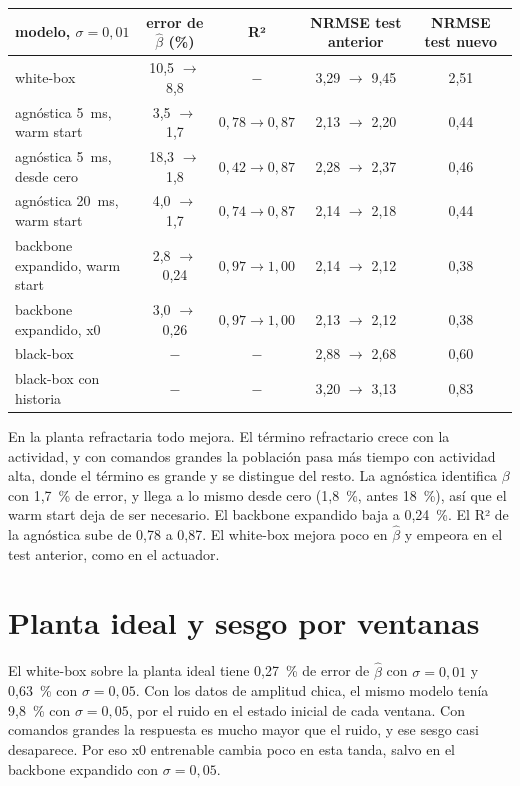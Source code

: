 \documentclass[10pt,a4paper]{article}
\newcommand{\bh}{\hat\beta}
\begin{document}
\begin{center}
\small
\begin{tabular}{@{}lcccc@{}}
\toprule
modelo, $\sigma = 0{,}01$ & error de $\bh$ (\%) & R² & NRMSE test anterior & NRMSE test nuevo \\
\midrule
white-box & 10,5 $\to$ 8,8 & $-$ & 3,29 $\to$ 9,45 & 2,51 \\
agnóstica 5~ms, warm start & 3,5 $\to$ 1,7 & $0{,}78 \to 0{,}87$ & 2,13 $\to$ 2,20 & 0,44 \\
agnóstica 5~ms, desde cero & 18,3 $\to$ 1,8 & $0{,}42 \to 0{,}87$ & 2,28 $\to$ 2,37 & 0,46 \\
agnóstica 20~ms, warm start & 4,0 $\to$ 1,7 & $0{,}74 \to 0{,}87$ & 2,14 $\to$ 2,18 & 0,44 \\
backbone expandido, warm start & 2,8 $\to$ 0,24 & $0{,}97 \to 1{,}00$ & 2,14 $\to$ 2,12 & 0,38 \\
backbone expandido, x0 & 3,0 $\to$ 0,26 & $0{,}97 \to 1{,}00$ & 2,13 $\to$ 2,12 & 0,38 \\
black-box & $-$ & $-$ & 2,88 $\to$ 2,68 & 0,60 \\
black-box con historia & $-$ & $-$ & 3,20 $\to$ 3,13 & 0,83 \\
\bottomrule
\end{tabular}
\end{center}

En la planta refractaria todo mejora. El término refractario crece con la actividad, y con comandos grandes la población pasa más tiempo con actividad alta, donde el término es grande y se distingue del resto. La agnóstica identifica $\beta$ con 1,7~\% de error, y llega a lo mismo desde cero (1,8~\%, antes 18~\%), así que el warm start deja de ser necesario. El backbone expandido baja a 0,24~\%. El R² de la agnóstica sube de 0,78 a 0,87. El white-box mejora poco en $\bh$ y empeora en el test anterior, como en el actuador.

\section{Planta ideal y sesgo por ventanas}

El white-box sobre la planta ideal tiene 0,27~\% de error de $\bh$ con $\sigma = 0{,}01$ y 0,63~\% con $\sigma = 0{,}05$. Con los datos de amplitud chica, el mismo modelo tenía 9,8~\% con $\sigma = 0{,}05$, por el ruido en el estado inicial de cada ventana. Con comandos grandes la respuesta es mucho mayor que el ruido, y ese sesgo casi desaparece. Por eso x0 entrenable cambia poco en esta tanda, salvo en el backbone expandido con $\sigma = 0{,}05$.
\end{document}
